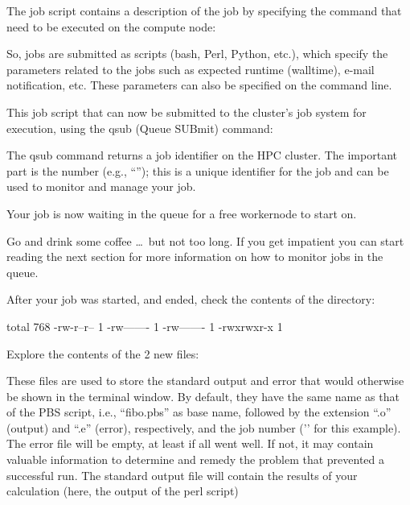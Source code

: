 The job script contains a description of the job by specifying the command that
need to be executed on the compute node:


So, jobs are submitted as scripts (bash, Perl, Python, etc.), which specify the
parameters related to the jobs such as expected runtime (walltime), e-mail
notification, etc. These parameters can also be specified on the command line.

This job script that can now be submitted to the cluster's job system for
execution, using the qsub (Queue SUBmit) command:

\begin{prompt}
\end{prompt}

The qsub command returns a job identifier on the HPC cluster. The important
part is the number (e.g., ``\jobnumber''); this is a unique identifier for the job
and can be used to monitor and manage your job.

Your job is now waiting in the queue for a free workernode to start on.

Go and drink some coffee \dots\ but not too long. If you get impatient you can
start reading the next section for more information on how to monitor jobs in the queue.

After your job was started, and ended, check the contents of the directory:

\begin{prompt}
total 768
-rw-r--r-- 1 %
-rw------- 1 %
-rw------- 1 %
-rwxrwxr-x 1 %
\end{prompt}

Explore the contents of the 2 new files:

\begin{prompt}
\end{prompt}

These files are used to store the standard output and error that would
otherwise be shown in the terminal window. By default, they have the same name
as that of the PBS script, i.e., ``fibo.pbs'' as base name, followed by the
extension ``.o'' (output) and ``.e'' (error), respectively, and the job number
('\jobnumber' for this example). The error file will be empty, at least if all went
well. If not, it may contain valuable information to determine and remedy the
problem that prevented a successful run. The standard output file will contain
the results of your calculation (here, the output of the perl script)

